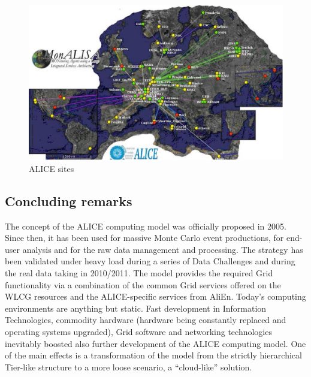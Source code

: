 \begin{figure}[htb] %
\centering
\includegraphics[width=13cm]{fig14.eps} %
\caption{ALICE sites}\label{fig14}
\end{figure}


\subsection{Concluding remarks}
%
The concept of the ALICE computing model was officially proposed in
2005. Since then, it has been used for massive Monte Carlo event
productions, for end-user analysis and for the raw data management
and processing. The strategy has been validated under heavy load
during a series of Data Challenges and during the real data taking
in 2010/2011. The model provides the required Grid functionality via
a combination of the common Grid services offered on the WLCG
resources and the ALICE-specific services from AliEn. Today's
computing environments are anything but static. Fast development in
Information Technologies, commodity hardware (hardware being
constantly replaced and operating systems upgraded), Grid software
and networking technologies inevitably boosted also further
development of the ALICE computing model. One of the main effects is
a transformation of the model from the strictly hierarchical
Tier-like structure to a more loose scenario, a ``cloud-like''
solution.
